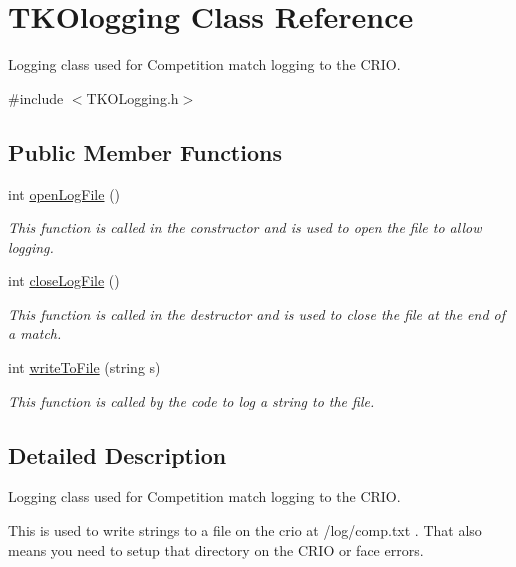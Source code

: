 \hypertarget{class_t_k_ologging}{\section{T\-K\-Ologging Class Reference}
\label{class_t_k_ologging}
}


Logging class used for Competition match logging to the C\-R\-I\-O.  




{\ttfamily \#include $<$T\-K\-O\-Logging.\-h$>$}

\subsection*{Public Member Functions}
\begin{DoxyCompactItemize}
\item 
int \hyperlink{class_t_k_ologging_a1fe1f55ccd1a5251de09113052bbb4fe}{open\-Log\-File} ()
\begin{DoxyCompactList}\small\item\em This function is called in the constructor and is used to open the file to allow logging. \end{DoxyCompactList}\item 
int \hyperlink{class_t_k_ologging_a15d31e7c126a6640ad3f65ae1a8c69df}{close\-Log\-File} ()
\begin{DoxyCompactList}\small\item\em This function is called in the destructor and is used to close the file at the end of a match. \end{DoxyCompactList}\item 
int \hyperlink{class_t_k_ologging_a31c68d3810943cc427d0b8114abc4ce8}{write\-To\-File} (string s)
\begin{DoxyCompactList}\small\item\em This function is called by the code to log a string to the file. \end{DoxyCompactList}\end{DoxyCompactItemize}


\subsection{Detailed Description}
Logging class used for Competition match logging to the C\-R\-I\-O. 

This is used to write strings to a file on the crio at /log/comp.txt . That also means you need to setup that directory on the C\-R\-I\-O or face errors. 

